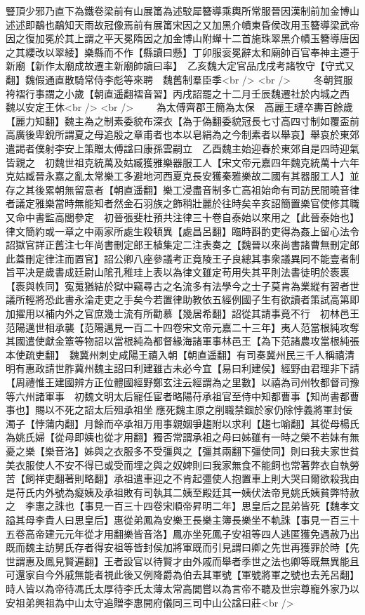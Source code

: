 豎頂少邪乃直下為鐵卷梁前有山展筩為述駮犀簪導乘輿所常服晉因漢制前加金博山述述即鷸也鷸知天雨故冠像焉前有展筩宋因之又加黑介幘東昏侯改用玉簪導梁武帝因之復加冕於其上謂之平天冕隋因之加金博山附蟬十二首施珠翠黑介幘玉簪導唐因之其纓改以翠緌】樂縣而不作【縣讀曰懸】丁卯服衮冕辭太和廟帥百官奉神主遷于新廟【新作太廟成故遷主新廟帥讀曰率】　乙亥魏大定官品戊戌考諸牧守【守式又翻】魏假通直散騎常侍李彪等來聘　魏舊制羣臣季<br />
<br />
　　冬朝賀服袴褶行事謂之小歲【朝直遥翻褶音習】丙戌詔罷之十二月壬辰魏遷社於内城之西　魏以安定王休<br />
<br />
　　為太傅齊郡王簡為太保　高麗王璉卒夀百餘歲【麗力知翻】魏主為之制素委貌布深衣【為于偽翻委貌冠長七寸高四寸制如覆盃前高廣後卑銳所謂夏之母追殷之章甫者也本以皂絹為之今制素者以舉哀】舉哀於東郊遣謁者僕射李安上策贈太傅諡曰康孫雲嗣立　乙酉魏主始迎春於東郊自是四時迎氣皆親之　初魏世祖克統萬及姑臧獲雅樂器服工人【宋文帝元嘉四年魏克統萬十六年克姑臧晉永嘉之亂太常樂工多避地河西夏克長安獲秦雅樂故二國有其器服工人】並存之其後累朝無留意者【朝直遥翻】樂工浸盡音制多亡高祖始命有司訪民間曉音律者議定雅樂當時無能知者然金石羽族之飾稍壯麗於往時矣辛亥詔簡置樂官使修其職又命中書監高閭參定　初晉張斐杜預共注律三十卷自泰始以來用之【此晉泰始也】律文簡約或一章之中兩家所處生殺頓異【處昌呂翻】臨時斟酌吏得為姦上留心法令詔獄官詳正舊注七年尚書刪定郎王植集定二注表奏之【魏晉以來尚書諸曹無刪定郎此蓋刪定律注而置官】詔公卿八座參議考正竟陵王子良總其事衆議異同不能壹者制旨平决是歲書成廷尉山隂孔稚珪上表以為律文雖定苟用失其平則法書徒明於袠裏【袠與帙同】寃䰟猶結於獄中竊尋古之名流多有法學今之士子莫肯為業縱有習者世議所輕將恐此書永淪走吏之手矣今若置律助教依五經例國子生有欲讀者策試高第即加擢用以補内外之官庶幾士流有所勸慕【幾居希翻】詔從其請事竟不行　初林邑王范陽邁世相承襲【范陽邁見一百二十四卷宋文帝元嘉二十三年】夷人范當根純攻奪其國遣使獻金簟等物詔以當根純為都督緣海諸軍事林邑王【為下范諸農攻當根純張本使疏吏翻】　魏冀州刺史咸陽王禧入朝【朝直遥翻】有司奏冀州民三千人稱禧清明有惠政請世胙冀州魏主詔曰利建雖古未必今宜【易曰利建侯】經野由君理非下請【周禮惟王建國辨方正位體國經野鄭玄注云經謂為之里數】以禧為司州牧都督司豫等六州諸軍事　初魏文明太后寵任宦者略陽苻承祖官至侍中知都曹事【知尚書都曹事也】賜以不死之詔太后殂承祖坐應死魏主原之削職禁錮於家仍除悖義將軍封佞濁子【悖蒲内翻】月餘而卒承祖万用事親姻爭趨附以求利【趨七喻翻】其從母楊氏為姚氏婦【從母即姨也從才用翻】獨否常謂承祖之母曰姊雖有一時之榮不若妹有無憂之樂【樂音洛】姊與之衣服多不受彊與之【彊其兩翻下彊使同】則曰我夫家世貧美衣服使人不安不得已或受而埋之與之奴婢則曰我家無食不能飼也常著弊衣自執勞苦【飼祥吏翻著則略翻】承祖遣車迎之不肯起彊使人抱置車上則大哭曰爾欲殺我由是苻氏内外號為癡姨及承祖敗有司執其二姨至殿廷其一姨伏法帝見姚氏姨貧弊特赦之　李惠之誅也【事見一百三十四卷宋順帝昇明二年】思皇后之昆弟皆死【魏孝文謚其母李貴人曰思皇后】惠從弟鳳為安樂王長樂主簿長樂坐不軌誅【事見一百三十五卷高帝建元元年從才用翻樂皆音洛】鳳亦坐死鳳子安祖等四人逃匿獲免遇赦乃出既而魏主訪舅氏存者得安祖等皆封侯加將軍既而引見謂曰卿之先世再獲罪於時【先世謂惠及鳳見賢遍翻】王者設官以待賢才由外戚而舉者季世之法也卿等既無異能且可還家自今外戚無能者視此後又例降爵為伯去其軍號【軍號將軍之號也去羌呂翻】時人皆以為帝待馮氏太厚待李氏太薄太常高閭嘗以為言帝不聽及世宗尊寵外家乃以安祖弟興祖為中山太守追贈李惠開府儀同三司中山公諡曰莊<br />
